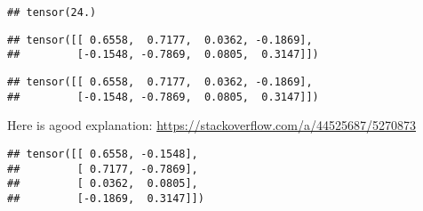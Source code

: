 \documentclass[]{book}
\newenvironment{Shaded}{\begin{snugshade}}{\end{snugshade}}
\newcommand{\CommentTok}[1]{\textcolor[rgb]{0.56,0.35,0.01}{\textit{#1}}}
\newcommand{\DataTypeTok}[1]{\textcolor[rgb]{0.13,0.29,0.53}{#1}}
\newcommand{\KeywordTok}[1]{\textcolor[rgb]{0.13,0.29,0.53}{\textbf{#1}}}
\newcommand{\NormalTok}[1]{#1}
\newcommand{\OperatorTok}[1]{\textcolor[rgb]{0.81,0.36,0.00}{\textbf{#1}}}
\newcommand{\StringTok}[1]{\textcolor[rgb]{0.31,0.60,0.02}{#1}}
\begin{document}
\begin{verbatim}
## tensor(24.)
\end{verbatim}

\begin{Shaded}
\end{Shaded}

\begin{verbatim}
## tensor([[ 0.6558,  0.7177,  0.0362, -0.1869],
##         [-0.1548, -0.7869,  0.0805,  0.3147]])
\end{verbatim}

\begin{Shaded}
\end{Shaded}

\begin{verbatim}
## tensor([[ 0.6558,  0.7177,  0.0362, -0.1869],
##         [-0.1548, -0.7869,  0.0805,  0.3147]])
\end{verbatim}

Here is agood explanation: \url{https://stackoverflow.com/a/44525687/5270873}

\begin{Shaded}
\end{Shaded}

\begin{verbatim}
## tensor([[ 0.6558, -0.1548],
##         [ 0.7177, -0.7869],
##         [ 0.0362,  0.0805],
##         [-0.1869,  0.3147]])
\end{verbatim}

\begin{Shaded}
\end{Shaded}
\end{document}
